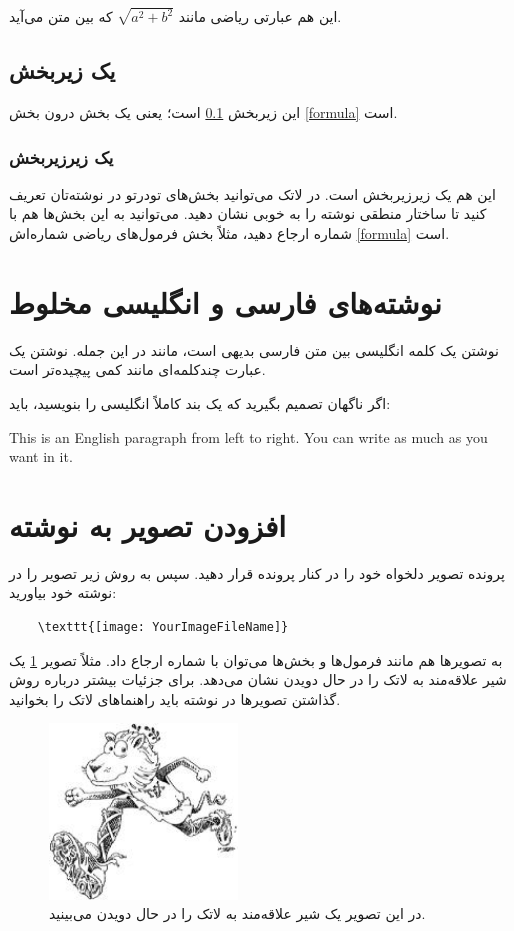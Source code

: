 این هم عبارتی ریاضی مانند 
$\sqrt{a^2+b^2}$
که بین متن می‌آید.
\subsection{یک زیربخش}\label{zirbakhsh}

این زیربخش \ref{zirbakhsh} است؛ یعنی یک بخش درون بخش \ref{formula} است.
\subsubsection{یک زیرزیربخش}
این هم یک زیرزیربخش است. در لاتک می‌توانید بخش‌های تودرتو در نوشته‌تان تعریف کنید تا ساختار منطقی نوشته را به خوبی نشان دهید. می‌توانید به این بخش‌ها هم با شماره ارجاع دهید، مثلاً بخش فرمول‌های ریاضی شماره‌اش \ref{formula} است.
\section{نوشته‌های فارسی و انگلیسی مخلوط}
نوشتن یک کلمه انگلیسی بین متن فارسی بدیهی است، مانند 
در این جمله.
نوشتن یک عبارت چندکلمه‌ای مانند
 کمی پیچیده‌تر است.

اگر ناگهان تصمیم بگیرید که یک بند کاملاً انگلیسی را بنویسید، باید:
\begin{latin}
	This is an English paragraph from left to right. You can write as much as you want in it.
\end{latin}
\section{افزودن تصویر به نوشته}
پرونده تصویر دلخواه خود را در کنار پرونده  قرار دهید. سپس به روش زیر تصویر را در نوشته خود بیاورید:
\begin{latin}
	\begin{verbatim}
	\texttt{[image: YourImageFileName]}
	\end{verbatim}
\end{latin}
به تصویرها هم مانند فرمول‌ها و بخش‌ها می‌توان با شماره ارجاع داد. مثلاً تصویر  \ref{fig:shir} یک شیر علاقه‌مند به لاتک را در حال دویدن نشان می‌دهد. برای جزئیات بیشتر درباره روش گذاشتن تصویرها در نوشته باید راهنماهای لاتک را بخوانید.
\begin{figure}%
	\centerline{\includegraphics[width=5cm]{Figures/Ch2/lion.jpg}}
	\caption{در این تصویر یک شیر علاقه‌مند به لاتک را در حال دویدن می‌بینید.}
	\label{fig:shir}
\end{figure}

